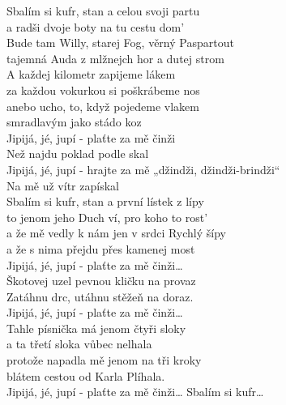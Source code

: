 
\vspace{-4.5pt}
\ve{}
\vspace{-4.5pt}
Sbalím si kufr, stan a  celou svoji  partu \\
a radši dvoje boty na tu cestu dom' \\
Bude tam Willy, starej Fog, věrný  Paspartout \\ 
tajemná Auda z mlžnejch hor a dutej strom \\
\vspace{-4.5pt}
\ve{}
\vspace{-4.5pt}
A každej kilometr zapijeme lákem \\
za každou vokurkou si poškrábeme nos \\
anebo ucho, to, když pojedeme vlakem \\
smradlavým jako stádo koz \\
\vspace{-4.5pt}
\cho{}
\vspace{-4.5pt}
Jipijá, jé, jupí - plaťte za mě činži \\
Než najdu poklad podle skal \\
Jipijá, jé, jupí - hrajte za mě „džindži, džindži-brindži“ \\
Na mě už vítr zapískal \\
\vspace{-4.5pt}
\ve{}
\vspace{-4.5pt}
Sbalím si kufr, stan a první lístek z lípy \\
to jenom jeho Duch ví, pro koho to rost' \\
a že mě vedly k nám jen v srdci Rychlý šípy \\
a že s nima přejdu přes kamenej most \\
\vspace{-4.5pt}
\cho{}
\vspace{-4.5pt}
Jipijá, jé, jupí - plaťte za mě činži… \\
Škotovej uzel pevnou kličku na provaz \\
Zatáhnu drc, utáhnu stěžeň na doraz. \\
\vspace{-4.5pt}
\cho{}
\vspace{-4.5pt}
Jipijá, jé, jupí - plaťte za mě činži… \\
Tahle písnička má jenom čtyři sloky \\
a ta třetí sloka vůbec nelhala \\
protože napadla mě jenom na tři kroky \\
blátem cestou od Karla Plíhala. \\
\vspace{-4.5pt}
\cho{}
\vspace{-4.5pt}
Jipijá, jé, jupí - plaťte za mě činži…  Sbalím si kufr… \\
\esong{}